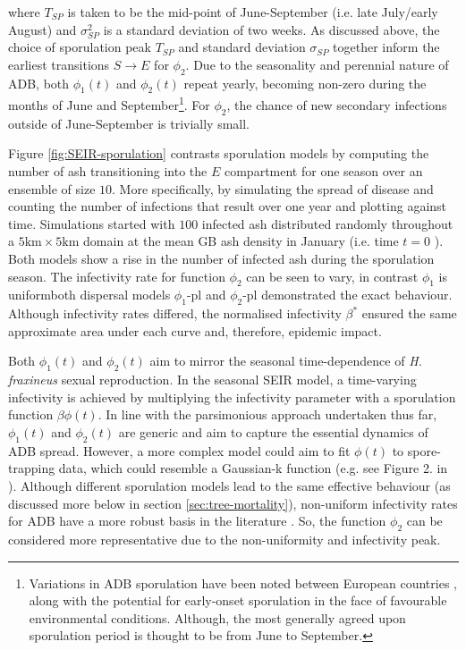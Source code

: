 where $T_{SP}$ is taken to be the mid-point of June-September (i.e. late July/early August) and $\sigma_{SP}^2$ is a standard deviation of two weeks.
As discussed above, the choice of sporulation peak $T_{SP}$ and standard deviation $\sigma_{SP}$ together inform the earliest transitions $S\rightarrow E$ for $\phi_2$.
Due to the seasonality and perennial nature of ADB, both $\phi_1(t)$ and $\phi_2(t)$ repeat yearly, becoming non-zero during the months of June and September\footnote{Variations in ADB sporulation have been noted between European countries \cite{https://doi.org/10.1111/mpp.12073}, along with the potential for early-onset sporulation in the face of favourable environmental conditions. Although, the most generally agreed upon sporulation period is thought to be from June to September.}.
For $\phi_2$, the chance of new secondary infections outside of June-September is trivially small.

Figure \ref{fig:SEIR-sporulation} contrasts sporulation models by computing the number of ash transitioning into the $E$ compartment for one season over an ensemble of size $10$.
More specifically, by simulating the spread of disease and counting the number of infections that result over one year and plotting against time.
Simulations started with $100$ infected ash distributed randomly throughout a $\mathrm{5km \times 5km}$ domain at the mean GB ash density in January (i.e. time $t=0$ ).
Both models show a rise in the number of infected ash during the sporulation season.
The infectivity rate for function $\phi_2$ can be seen to vary, in contrast $\phi_1$ is uniform\textemdash both dispersal models $\phi_1$-pl and $\phi_2$-pl demonstrated the exact behaviour.
Although infectivity rates differed, the normalised infectivity $\beta^*$ ensured the same approximate area under each curve and, therefore, epidemic impact.

Both $\phi_1(t)$ and $\phi_2(t)$ aim to mirror the seasonal time-dependence of \textit{H. fraxineus} sexual reproduction.
In the seasonal SEIR model, a time-varying infectivity is achieved by multiplying the infectivity parameter with a sporulation function $\beta\phi(t)$.
In line with the parsimonious approach undertaken thus far, $\phi_1(t)$ and $\phi_2(t)$ are generic and aim to capture the essential dynamics of ADB spread.
However, a more complex model could aim to fit $\phi(t)$ to spore-trapping data, which could resemble a Gaussian-k function (e.g. see Figure 2. in \cite{grosdidier2018tracking}).
Although different sporulation models lead to the same effective behaviour (as discussed more below in section \ref{sec:tree-mortality}), 
non-uniform infectivity rates for ADB have a more robust basis in the literature \cite{grosdidier2018tracking, time-varying-infectivity, hietala2013invasive, segarra2001epidemic}.
So, the function $\phi_2$ can be considered more representative due to the non-uniformity and infectivity peak.

